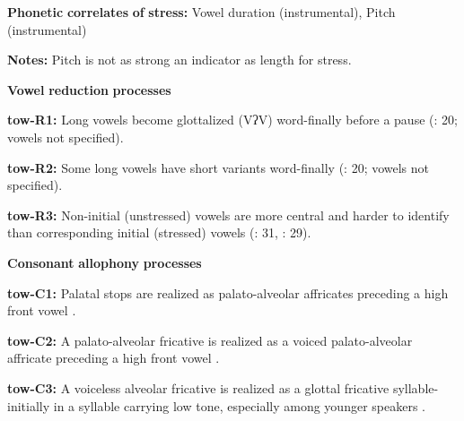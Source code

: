 \begin{styleBody}
\textbf{Phonetic} \textbf{correlates} \textbf{of} \textbf{stress:} Vowel duration (instrumental), Pitch (instrumental)
\end{styleBody}

\begin{styleBody}
\textbf{Notes:} Pitch is not as strong an indicator as length for stress.
\end{styleBody}

\begin{styleBody}
\textbf{Vowel} \textbf{reduction} \textbf{processes}
\end{styleBody}

\begin{styleBody}
\textbf{tow-R1:} Long vowels become glottalized (VʔV) word-finally before a pause (\citealt{Yumitani1998}: 20; vowels not specified).
\end{styleBody}

\begin{styleBody}
\textbf{tow-R2:} Some long vowels have short variants word-finally (\citealt{Yumitani1998}: 20; vowels not specified).
\end{styleBody}

\begin{styleBody}
\textbf{tow-R3:} Non-initial (unstressed) vowels are more central and harder to identify than corresponding initial (stressed) vowels (\citealt{Yumitani1998}: 31, \citealt{Bell1993}: 29).
\end{styleBody}

\begin{styleBody}
\textbf{Consonant} \textbf{allophony} \textbf{processes}
\end{styleBody}

\begin{styleBody}
\textbf{tow-C1:} Palatal stops are realized as palato-alveolar affricates preceding a high front vowel \citep[13]{Yumitani1998}.
\end{styleBody}

\begin{styleBody}
\textbf{tow-C2:} A palato-alveolar fricative is realized as a voiced palato-alveolar affricate preceding a high front vowel \citep[13]{Yumitani1998}.
\end{styleBody}

\begin{styleBody}
\textbf{tow-C3:} A voiceless alveolar fricative is realized as a glottal fricative syllable-initially in a syllable carrying low tone, especially among younger speakers \citep[13]{Yumitani1998}.
\end{styleBody}

